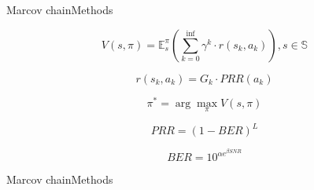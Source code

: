 \begin{frame}{Marcov chain}{Methods}


\begin{equation}
V(s, \pi)=\mathbb{E}_{s}^{\pi}\left(\sum_{k=0}^{\mathrm{inf}} \gamma^{k} \cdot r\left(s_{k}, a_{k}\right)\right), s \in \mathbb{S}
\end{equation}

\begin{equation}
r\left(s_{k}, a_{k}\right)=G_{k} \cdot P R R\left(a_{k}\right)
\end{equation}

\begin{equation}
\pi^{*}=\arg \max _{\pi} V(s, \pi)
\end{equation}



\begin{equation}
PRR=(1-BER)^{L}
\end{equation}

\begin{equation}
BER=10^{\alpha e^{\beta SNR}}
\end{equation}

\end{frame}

\begin{frame}{Marcov chain}{Methods}
\end{frame}


